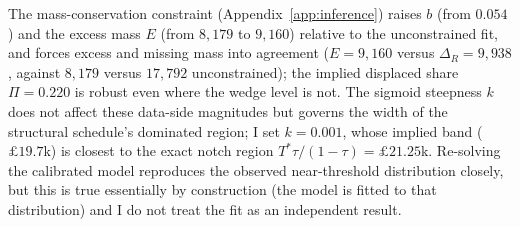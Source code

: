 The mass-conservation constraint (Appendix~\ref{app:inference}) raises $b$ (from
$0.054$) and the excess mass $E$ (from $8{,}179$ to $9{,}160$) relative to the
unconstrained fit, and forces excess and missing mass into agreement ($E=9{,}160$
versus $\Delta_{R}=9{,}938$, against $8{,}179$ versus $17{,}792$ unconstrained);
the implied displaced share $\Pi=0.220$ is robust even where the wedge level is
not. The sigmoid steepness $k$ does not affect these data-side magnitudes but
governs the width of the structural schedule's dominated region; I set
$k=0.001$, whose implied band ($\pounds19.7$k) is closest to the exact
\citet{klevenwaseem2013} notch region $T^{*}\tau/(1-\tau)=\pounds21.25$k.
Re-solving the calibrated model reproduces the observed near-threshold
distribution closely, but this is true essentially by construction (the model is
fitted to that distribution) and I do not treat the fit as an independent result.
